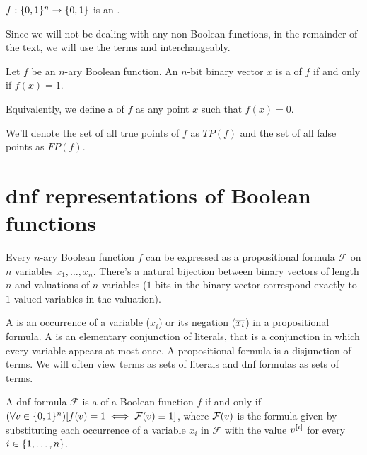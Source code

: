 \begin{definition}
$f: \{0, 1\}^n \rightarrow \{0, 1\}$ is
an .
\end{definition}

Since we will not be dealing with any non-Boolean functions,
in the remainder of the text,
we will use the terms
 and 
interchangeably.

\begin{definition}
Let $f$ be an $n$-ary Boolean function.
An $n$-bit binary vector $x$ is a 
of $f$ if and only if $f(x)  = 1$.
\end{definition}

Equivalently,
we define a  of $f$
as any point $x$
such that $f(x) = 0$.

We'll denote the set of all true points of $f$ as $TP(f)$
and the set of all false points as $FP(f)$.

\section{\texorpdfstring{\acrshort{dnf}}{DNF}
representations of Boolean functions}

Every $n$-ary Boolean function $f$ can be expressed
as a propositional formula $\mathcal{F}$ on $n$ variables
$x_1, \ldots, x_n$.
There's a natural bijection
between binary vectors of length $n$
and valuations of $n$ variables
($1$-bits in the binary vector
correspond exactly to $1$-valued variables
in the valuation).


\begin{definition}
A  is an occurrence
of a variable ($x_i$) or its negation ($\overline{x_i}$)
in a propositional formula.
A  is
an elementary conjunction of literals,
that is a conjunction in which every variable appears
at most once.
A  propositional formula
is a disjunction of terms.
We will often view terms as sets of literals
and \acrshort{dnf} formulas as sets of terms.
\end{definition}

A \acrshort{dnf} formula $\mathcal{F}$ is
a 
of a Boolean function $f$
if and only if
$(\forall v \in \{0, 1\}^n) [f(v) = 1 \iff
\mathcal{F} (v) \equiv 1]$,
where $\mathcal{F} (v)$ is the formula
given by substituting
each occurrence of a variable $x_i$ in $\mathcal{F}$
with the value $v^{[i]}$
for every $i \in \{1, \ldots, n\}$.

